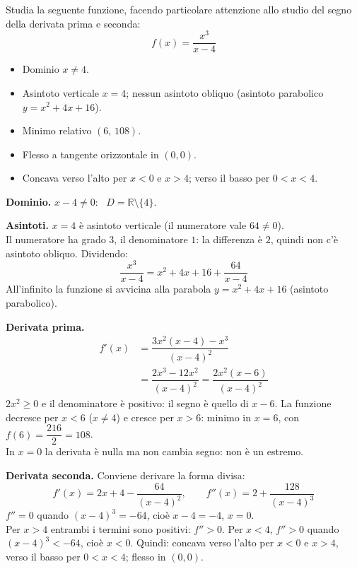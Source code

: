 
\begin{question}[ID=3.2, subtitle={Studio di $f(x) = x^3/(x-4)$ con derivate}, tags={derivate, studio di funzione}, difficulty=difficile]
Studia la seguente funzione, facendo particolare attenzione allo studio del segno della derivata prima e seconda:
\begin{equation*}
    f(x) = \frac{x^3}{x- 4}
\end{equation*}
\begin{solution}
\begin{itemize}
    \item Dominio $x\neq4$.
    \item Asintoto verticale $x=4$; nessun asintoto obliquo (asintoto parabolico $y=x^2+4x+16$).
    \item Minimo relativo $(6,\,108)$.
    \item Flesso a tangente orizzontale in $(0,0)$.
    \item Concava verso l'alto per $x<0$ e $x>4$; verso il basso per $0<x<4$.
\end{itemize}
\end{solution}
\begin{explanation}
\textbf{Dominio.} $x-4\neq0$: \ $D=\mathbb{R}\setminus\{4\}$.

\textbf{Asintoti.} $x=4$ è asintoto verticale (il numeratore vale $64\neq0$). \\
Il numeratore ha grado $3$, il denominatore $1$: la differenza è $2$, quindi non c'è asintoto obliquo. Dividendo:
\[ \dfrac{x^3}{x-4}=x^2+4x+16+\dfrac{64}{x-4} \]
All'infinito la funzione si avvicina alla parabola $y=x^2+4x+16$ (asintoto parabolico).

\textbf{Derivata prima.}
\[\begin{aligned}
f'(x) &= \dfrac{3x^2(x-4)-x^3}{(x-4)^2}\\
&= \dfrac{2x^3-12x^2}{(x-4)^2}=\dfrac{2x^2(x-6)}{(x-4)^2}
\end{aligned}\]
$2x^2\geq0$ e il denominatore è positivo: il segno è quello di $x-6$. La funzione decresce per $x<6$ ($x\neq4$) e cresce per $x>6$: minimo in $x=6$, con $f(6)=\dfrac{216}{2}=108$. \\
In $x=0$ la derivata è nulla ma non cambia segno: non è un estremo.

\textbf{Derivata seconda.} Conviene derivare la forma divisa:
\[ f'(x)=2x+4-\dfrac{64}{(x-4)^2}, \qquad f''(x)=2+\dfrac{128}{(x-4)^3} \]
$f''=0$ quando $(x-4)^3=-64$, cioè $x-4=-4$, $x=0$. \\
Per $x>4$ entrambi i termini sono positivi: $f''>0$. Per $x<4$, $f''>0$ quando $(x-4)^3<-64$, cioè $x<0$. Quindi: concava verso l'alto per $x<0$ e $x>4$, verso il basso per $0<x<4$; flesso in $(0,0)$.
\end{explanation}
\end{question}

